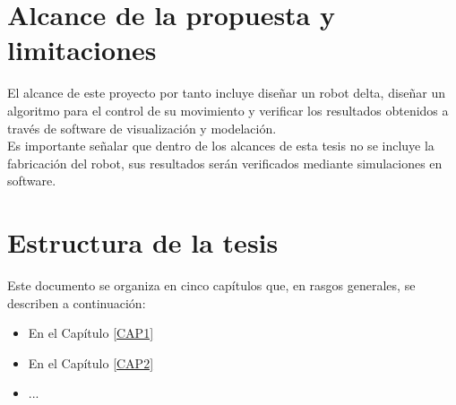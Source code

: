 \section{Alcance de la propuesta y limitaciones}
El alcance de este proyecto por tanto incluye diseñar un robot delta, diseñar un algoritmo para el control de su movimiento y verificar los resultados obtenidos a través de software de visualización y modelación.\\ 
Es importante señalar que dentro de los alcances de esta tesis no se incluye la fabricación del robot, sus resultados serán verificados mediante simulaciones en software.


\section{Estructura de la tesis}

Este documento se organiza en cinco capítulos que, en rasgos generales, se describen a continuación:

\begin{itemize}
    \item En el Capítulo \ref{CAP1}
    \item En el Capítulo \ref{CAP2}
    \item ...
\end{itemize}